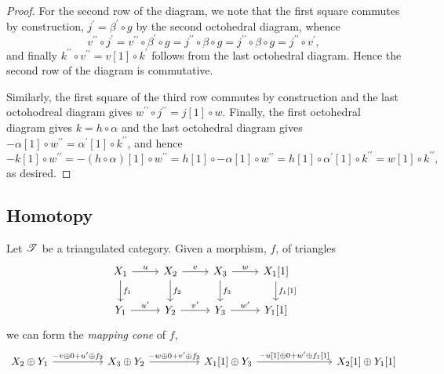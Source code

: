 \documentclass[dissertation.tex]{subfiles}
\begin{document}
\begin{prop}
\begin{proof}
    For the second row of the diagram, we note that the first square commutes by construction,
    $j^\prime = \beta^\prime \circ g$ by the second octohedral diagram, whence
    $$v^{\prime\prime} \circ j^\prime = v^{\prime\prime} \circ \beta^\prime \circ g = j^{\prime\prime} \circ \beta \circ g = j^{\prime\prime} \circ \beta \circ g = j^{\prime\prime} \circ v^\prime,$$
    and finally $k^{\prime\prime} \circ v^{\prime\prime} = v[1] \circ k^\prime$ follows from the last octohedral diagram.
    Hence the second row of the diagram is commutative.
    
    Similarly, the first square of the third row commutes by construction and the last octohodreal diagram gives $w^{\prime\prime} \circ j^{\prime\prime} = j[1] \circ w$.
    Finally, the first octohedral diagram gives $k = h \circ \alpha$ and the last octohedral diagram gives $-\alpha[1] \circ w^{\prime\prime} = \alpha^\prime[1] \circ k^{\prime\prime}$, and hence    
    $$-k[1] \circ w^{\prime\prime} = -(h \circ \alpha)[1] \circ w^{\prime\prime} = h[1] \circ -\alpha[1] \circ w^{\prime\prime} = h[1] \circ \alpha^\prime[1] \circ k^{\prime\prime} = w[1] \circ k^{\prime\prime},$$
    as desired.
  \end{proof}
\end{prop}

\subsection{Homotopy}
\begin{defn}
  Let $\mathscr{T}$ be a triangulated category.
  Given a morphism, $f$, of triangles
  $$\begin{tikzcd}
    X_1 \arrow{r}{u}\arrow{d}{f_1} & X_2 \arrow{r}{v}\arrow{d}{f_2} & X_3 \arrow{r}{w}\arrow{d}{f_3} & X_1[1]\arrow{d}{f_1[1]}\\
    Y_1 \arrow{r}{u^\prime} & Y_2 \arrow{r}{v^\prime} & Y_3 \arrow{r}{w^\prime} & Y_1[1]
  \end{tikzcd}$$
  we can form the {\it mapping cone} of $f$, 
  $$\begin{tikzcd}
    X_2 \oplus Y_1 \arrow{rr}{-v \oplus 0 + u^\prime \oplus f_2} & & X_3 \oplus Y_2 \arrow{rr}{-w \oplus 0 + v^\prime \oplus f_2} & & X_1[1] \oplus Y_3 \arrow{rrr}{-u[1] \oplus 0 + w^\prime \oplus f_1[1]} & & & X_2[1] \oplus Y_1[1]
  \end{tikzcd}$$
\end{defn}
\end{document}
